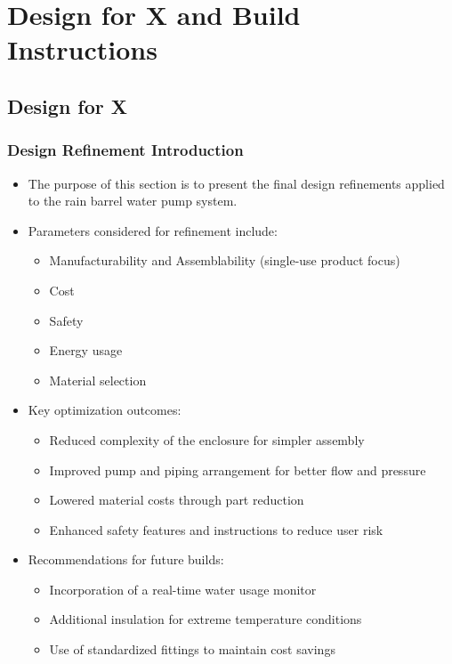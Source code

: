 \documentclass[12pt]{report}
\begin{document}
\chapter{Design for X and Build Instructions}

\section{Design for X}

\subsection{Design Refinement Introduction}
\begin{itemize}[leftmargin=1.5cm]
    \item The purpose of this section is to present the final design refinements applied to the rain barrel water pump system.
    \item Parameters considered for refinement include:
    \begin{itemize}
        \item Manufacturability and Assemblability (single-use product focus)
        \item Cost
        \item Safety
        \item Energy usage
        \item Material selection
    \end{itemize}
    \item Key optimization outcomes:
    \begin{itemize}
        \item Reduced complexity of the enclosure for simpler assembly
        \item Improved pump and piping arrangement for better flow and pressure
        \item Lowered material costs through part reduction
        \item Enhanced safety features and instructions to reduce user risk
    \end{itemize}
    \item Recommendations for future builds:
    \begin{itemize}
        \item Incorporation of a real-time water usage monitor
        \item Additional insulation for extreme temperature conditions
        \item Use of standardized fittings to maintain cost savings
    \end{itemize}
\end{itemize}
\end{document}
